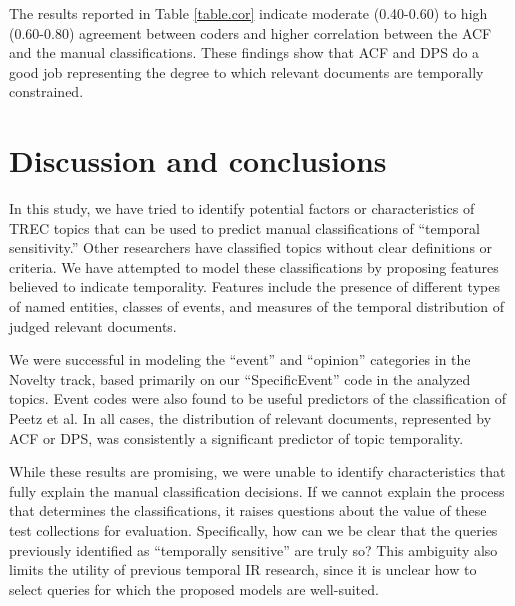 \documentclass{sig-alternate}
\begin{document}
The results reported in Table \ref{table.cor} indicate moderate (0.40-0.60) to high (0.60-0.80) agreement between coders and higher correlation between the ACF and the manual classifications. These findings show that ACF and DPS do a good job representing the degree to which relevant documents are temporally constrained. 



\section{Discussion and conclusions}

In this study, we have tried to identify potential factors or characteristics of TREC topics that can be used to predict manual classifications of ``temporal sensitivity.'' Other researchers have classified topics without clear definitions or criteria. We have attempted to model these classifications by proposing features believed to indicate temporality.  Features include the presence of different types of named entities, classes of events, and measures of the temporal distribution of judged relevant documents.

We were successful in modeling the ``event'' and ``opinion'' categories in the Novelty track, based primarily on our ``SpecificEvent'' code in the analyzed topics.  Event codes were also found to be useful predictors of the classification of Peetz et al. In all cases, the distribution of relevant documents, represented by ACF or DPS, was consistently a significant predictor of topic temporality. 

While these results are promising, we were unable to identify characteristics that fully explain the manual classification decisions. If we cannot explain the process that determines the classifications, it raises questions about the value of these test collections for evaluation. Specifically, how can we be clear that the queries previously identified as ``temporally sensitive'' are truly so? This ambiguity also limits the utility of previous temporal IR research, since it is unclear how to select queries for which the proposed models are well-suited.
\end{document}
